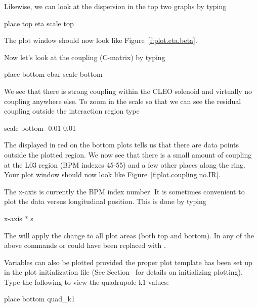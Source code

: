 Likewise, we can look at the dispersion in the top two graphs by
typing
\begin{example}
  place top eta
  scale top
\end{example}
The plot window should now look like Figure~\ref{f:plot.eta.beta}.

Now let's look at the coupling (C-matrix) by typing
\begin{example}
  place bottom cbar
  scale bottom
\end{example}
We see that there is strong coupling within the CLEO solenoid and
virtually no coupling anywhere else. To zoom in the scale so that we
can see the residual coupling outside the interaction region type
\begin{example}
  scale bottom -0.01 0.01
\end{example}
The  displayed in red on the bottom plots tells us
that there are data points outside the plotted region.  We now see
that there is a small amount of coupling at the L03 region (BPM
indexes 45-55) and a few other places along the ring. Your plot window
should now look like Figure~\ref{f:plot.coupling.no.IR}.

The x-axis is currently the BPM index number. It is sometimes
convenient to plot the data versus longitudinal position. This is done
by typing
\begin{example}
  x-axis * s
\end{example}

The  will apply the change to all plot areas (both top and
bottom). In any of the above commands  or  could
have been replaced with .

Variables can also be plotted provided the proper plot template has
been set up in the plot initialization file (See
Section~ for details on initializing plotting). Type
the following to view the quadrupole k1 values:
\begin{example}
  place bottom quad_k1
\end{example}

